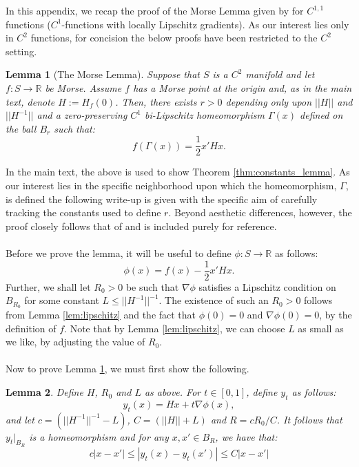 \documentclass[11pt]{article}
\newcommand{\1}{\mathbf{1}}
\newtheorem{lemma}{Lemma}%
\theoremstyle{definition}
\theoremstyle{remark}
\begin{document}
In this appendix, we recap the proof of the Morse Lemma given by \cite{ioffe1997} for $C^{1,1}$ functions ($C^1$-functions with locally Lipschitz gradients). As our interest lies only in $C^{2}$ functions, for concision the below proofs have been restricted to the $C^2$ setting. 

\begin{mdframed}
\begin{lemma}[The Morse Lemma]\label{lem:morse} Suppose that $S$ is a $C^{2}$ manifold and let $f:S\rightarrow \mathbb{R}$ be Morse. Assume $f$ has a Morse point at the origin and, as in the main text, denote $H:=H_f(0)$. Then, there exists $r >0$ depending only upon $||H||$ and $||H^{-1}||$ and a zero-preserving $C^1$ bi-Lipschitz homeomorphism $\Gamma(x)$ defined on the ball $B_r$ such that:
\begin{equation}\nonumber
   f(\Gamma(x)) = \frac{1}{2}x'Hx.
\end{equation}
\end{lemma}
\vspace*{0.1cm}
\end{mdframed}
In the main text, the above is used to show Theorem \ref{thm:constants_lemma}. As our interest lies in the specific neighborhood upon which the homeomorphism, $\Gamma$, is defined the following write-up is given with the specific aim of carefully tracking the constants used to define $r$. Beyond aesthetic differences, however, the proof closely follows that of \cite{ioffe1997} and is included purely for reference.\\
\\
Before we prove the lemma, it will be useful to define $\phi:S \rightarrow \mathbb{R}$ as follows:
\begin{equation}\nonumber
    \phi(x)=f(x)-\frac{1}{2}x'Hx.
\end{equation}
Further, we shall let $R_0>0$ be such that $\nabla \phi$ satisfies a Lipschitz condition on $B_{R_0}$ for some constant $L\leq ||H^{-1}||^{-1}$. The existence of such an $R_0>0$ follows from Lemma \ref{lem:lipschitz} and the fact that $\phi(0)=0$ and $\nabla \phi(0)=0$, by the definition of $f$. Note that by Lemma \ref{lem:lipschitz}, we can choose $L$ as small as we like, by adjusting the value of $R_0$.\\
\\
Now to prove Lemma \ref{lem:morse}, we must first show the following.
\begin{mdframed}
\begin{lemma}\label{lem:param} Define $H$, $R_0$ and $L$ as above. For $t \in [0,1]$, define $y_t$ as follows:
    \begin{equation}\nonumber
        y_t(x) = Hx + t\nabla \phi(x),
    \end{equation}
    and let $c=(||H^{-1}||^{-1}-L)$, $C=(||H||+L)$ and $R=cR_0/C$. It follows that $y_t|_{B_R}$ is a homeomorphism and for any $x, x' \in B_R$, we have that:
    \begin{equation}\nonumber
        c |x - x' | \leq | y_t(x) - y_t(x') | \leq C |x-x'|
    \end{equation} 
\end{lemma}
\vspace*{0.05cm}
\end{mdframed}
\end{document}
